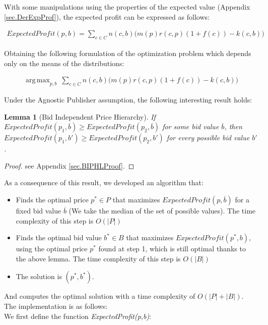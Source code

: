 \documentclass[11pt]{article} %
\DeclareMathOperator*{\argmax}{arg\,max}
\newtheorem*{lemma}{Lemma}
\begin{document}
With some manipulations using the properties of the expected value (Appendix \ref{sec.DerExpProf}), the expected profit can be expressed as follows:

\begin{align*}
ExpectedProfit(p,b)=\sum_{c \in C}{n(c,b)\Big(m(p)r(c,p)(1+f(c))-k(c,b)\Big)}
\end{align*}

Obtaining the following formulation of the optimization problem which depends only on the means of the distributions:

\begin{align*}
\argmax_{p,b}{\ \sum_{c \in C}{n(c,b)\Big(m(p)r(c,p)(1+f(c))-k(c,b)\Big)}}
\end{align*}

Under the Agnostic Publisher assumption, the following interesting result holds:

\begin{lemma}[Bid Independent Price Hierarchy]
If $ExpectedProfit(p_1,\overline b) \ge ExpectedProfit(p_2,\overline b)$ for some bid value $\overline b$,  then $ExpectedProfit(p_1, b') \ge ExpectedProfit(p_2, b')$  for every possible bid value $b'$.
\end{lemma}
\begin{proof}
see Appendix \ref{sec.BIPHLProof}.
\end{proof}

As a consequence of this result, we developed an algorithm that:
\begin{itemize}
\item Finds the optimal price $p^*\in P$ that maximizes $ExpectedProfit(p,\overline b)$ for a fixed bid value $\overline b$ (We take the median of the set of possible values). The time complexity of this step is $O(|P|)$
\item Finds the optimal bid value $b^* \in B$ that maximizes $ExpectedProfit(p^*, b)$, using the optimal price $p^*$ found at step 1, which is still optimal thanks to the above lemma. The time complexity of this step is $O(|B|)$
\item The solution is $(p^*, b^*)$.
\end{itemize}
And computes the optimal solution with a time complexity of $O(|P|+|B|)$.\\

The implementation is as follows:\\
We first define the function \textit{ExpectedProfit(p,b)}:
\inputminted{python}{code/step1_expected_profit.py}
\end{document}
